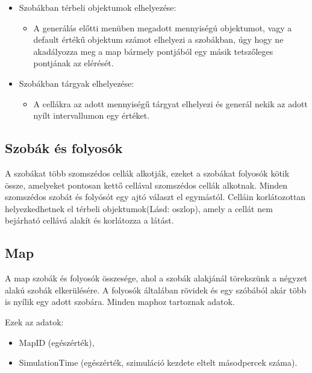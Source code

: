 \begin{itemize}
    \item Szobákban térbeli objektumok elhelyezése:
    
    \begin{itemize}
        \item A generálás előtti menüben megadott mennyiségú objektumot, vagy a default értékű objektum számot elhelyezi a szobákban, úgy hogy ne akadályozza meg a map bármely pontjából egy másik tetszőleges pontjának az elérését.
    \end{itemize}

    \item Szobákban tárgyak elhelyezése:
    
    \begin{itemize}
        \item A cellákra az adott mennyiségű tárgyat elhelyezi és generál nekik az adott nyílt intervallumon egy értéket.
    \end{itemize}

\end{itemize}

\subsection{Szobák és folyosók}

A szobákat több szomszédos cellák alkotják, ezeket a szobákat folyosók kötik össze, amelyeket pontosan kettő cellával szomszédos cellák alkotnak.
Minden szomszédos szobát és folyósót egy ajtó választ el egymástól.
Celláin korlátozottan helyezkedhetnek el térbeli objektumok(Lásd: oszlop), amely a cellát nem bejárható cellává alakít és korlátozza a látást.

\subsection{Map}

A map szobák és folyosók összesége, ahol a szobák alakjánál törekszünk a négyzet alakú szobák elkerülésére. A folyosók általában rövidek és egy szóbából akár több is nyílik egy adott szobára.
Minden maphoz tartoznak adatok.

\noindent Ezek az adatok:

\begin{itemize}
    \item MapID (egészérték),
    \item SimulationTime (egészérték, szimuláció kezdete eltelt másodpercek száma).
\end{itemize}

